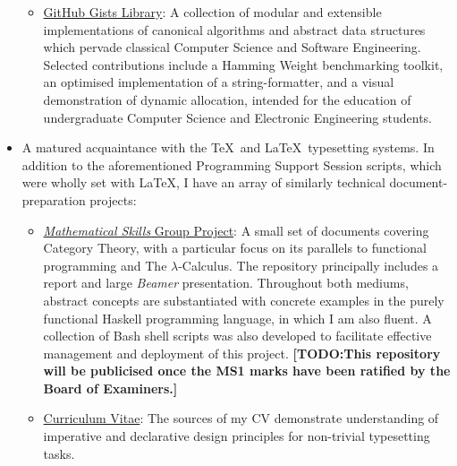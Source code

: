 \documentclass{article}
\makeatletter
\newcommand{\todomark}[1]{{\color{red}\textbf{[TODO:\@ #1]}}}
\newcommand{\githublink}[2]{\href{https://github.com/oliverdixon/#1}{#2}}
\newcommand{\gistlink}[2]{\href{https://gist.github.com/oliverdixon/#1}{#2}}
\makeatother
\begin{document}
\begin{itemize}
\begin{itemize}
                \item \gistlink{}{GitHub Gists Library}: A collection of modular
                and extensible implementations of canonical algorithms and
                abstract data structures which pervade classical Computer
                Science and Software Engineering. Selected contributions include
                a Hamming Weight benchmarking toolkit, an optimised
                implementation of a string-formatter, and a visual demonstration
                of dynamic allocation, intended for the education of
                undergraduate Computer Science and Electronic Engineering
                students.
        \end{itemize}
        \item A matured acquaintance with the \TeX\ and \LaTeX\ typesetting
        systems. In addition to the aforementioned Programming Support Session
        scripts, which were wholly set with \LaTeX, I have an array of similarly
        technical document-preparation projects:
        \begin{itemize}
                \item \githublink{MS1GP}{\textit{Mathematical Skills} Group
                Project}: A small set of documents covering Category Theory,
                with a particular focus on its parallels to functional
                programming and The $\lambda$-Calculus. The repository
                principally includes a report and large \textit{Beamer}
                presentation. Throughout both mediums, abstract concepts are
                substantiated with concrete examples in the purely functional
                Haskell programming language, in which I am also fluent. A
                collection of Bash shell scripts was also developed to
                facilitate effective management and deployment of this project.
                \todomark{This repository will be publicised once the MS1 marks
                have been ratified by the Board of Examiners.}

                \item \githublink{cv}{Curriculum Vitae}: The sources of my CV
                demonstrate understanding of imperative and declarative design
                principles for non-trivial typesetting tasks.


\end{itemize}
\end{itemize}
\end{document}
